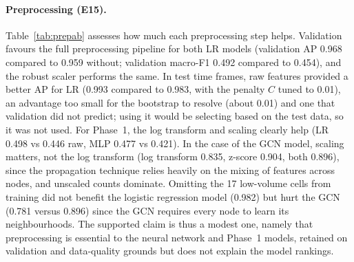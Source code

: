 \documentclass[11pt,a4paper]{report}
\begin{document}
\paragraph{Preprocessing (E15).} Table~\ref{tab:prepab} assesses how much each preprocessing step helps. Validation favours the full preprocessing pipeline for both LR models (validation AP 0.968 compared to 0.959 without; validation macro-F1 0.492 compared to 0.454), and the robust scaler performs the same. In test time frames, raw features provided a better AP for LR (0.993 compared to 0.983, with the penalty $C$ tuned to 0.01), an advantage too small for the bootstrap to resolve (about 0.01) and one that validation did not predict; using it would be selecting based on the test data, so it was not used. For Phase~1, the log transform and scaling clearly help (LR 0.498 vs 0.446 raw, MLP 0.477 vs 0.421). In the case of the GCN model, scaling matters, not the log transform (log transform 0.835, z-score 0.904, both 0.896), since the propagation technique relies heavily on the mixing of features across nodes, and unscaled counts dominate. Omitting the 17 low-volume cells from training did not benefit the logistic regression model (0.982) but hurt the GCN (0.781 versus 0.896) since the GCN requires every node to learn its neighbourhoods. The supported claim is thus a modest one, namely that preprocessing is essential to the neural network and Phase~1 models, retained on validation and data-quality grounds but does not explain the model rankings.
\begin{table}[H]
\centering\scriptsize
\caption{Preprocessing ablation (E15, post-hoc). LR is re-tuned per variant on validation; MLP, ResGCN and GCN (5 seeds) keep their E1/E3 hyperparameters}
\label{tab:prepab}
\end{table}
\end{document}
